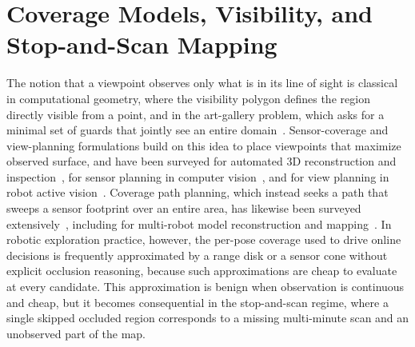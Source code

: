 \section{Coverage Models, Visibility, and Stop-and-Scan Mapping}
\label{sec:rw-coverage}

The notion that a viewpoint observes only what is in its line of sight is
classical in computational geometry, where the visibility polygon defines the
region directly visible from a point, and in the art-gallery problem, which
asks for a minimal set of guards that jointly see an entire
domain~\cite{gonzalez2002,orourke1987,urrutia2000}. Sensor-coverage and
view-planning formulations build on this idea to place viewpoints that maximize
observed surface, and have been surveyed for automated 3D reconstruction and
inspection~\cite{scott2003}, for sensor planning in computer
vision~\cite{tarabanis1995}, and for view planning in robot active
vision~\cite{zeng2020}. Coverage path planning, which instead seeks a path that
sweeps a sensor footprint over an entire area, has likewise been surveyed
extensively~\cite{choset2001,galceran2013}, including for multi-robot model
reconstruction and mapping~\cite{almadhoun2019}. In robotic exploration
practice, however, the per-pose coverage used to drive online decisions is
frequently approximated by a range disk or a sensor cone without explicit
occlusion reasoning, because such approximations are cheap to evaluate at every
candidate. This approximation is benign when observation is continuous and
cheap, but it becomes consequential in the stop-and-scan regime, where a single
skipped occluded region corresponds to a missing multi-minute scan and an
unobserved part of the map.


